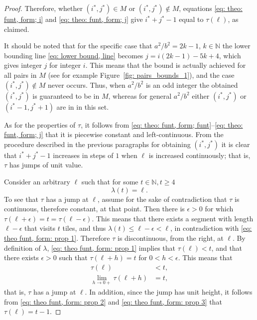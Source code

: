 \documentclass[12pt, a4paper]{article}
\newcommand{\funt}{\tau} %
\newcommand{\funl}{\lambda} %
\newcommand{\len}{\ell} %
\newcommand{\tiles}{t} %
\newcommand{\isoli}{i^\ast}
\newcommand{\jsoli}{j^\ast}
\newcommand{\mss}{M}
\newcommand{\touches}{visits}
\begin{document}
\begin{proof}
Therefore, whether $(\isoli,\jsoli) \in \mss$ or $(\isoli,\jsoli) \notin \mss$, equations \eqref{eq: theo: funt, form; i} and \eqref{eq: theo: funt, form; j} give $\isoli+\jsoli-1$ equal to $\funt(\len)$, as claimed.

It should be noted that for the specific case that $a^2/b^2 = 2k-1$, $k \in \mathbb N$ the lower bounding line \eqref{eq: lower bound, line} becomes $j = i(2k-1)-5k+4$, which gives integer $j$ for integer $i$. This means that the bound is actually achieved for all pairs in $\mss$ (see for example Figure~\ref{fig: pairs_bounds_1}), and the case $(\isoli,\jsoli) \notin \mss$ never occurs. Thus, when $a^2/b^2$ is an odd integer the obtained $(\isoli,\jsoli)$ is guaranteed to be in $\mss$, whereas for general $a^2/b^2$ either $(\isoli,\jsoli)$ or $(\isoli-1,\jsoli+1)$ are in in this set.

As for the properties of $\funt$, it follows from \eqref{eq: theo: funt, form; funt}--\eqref{eq: theo: funt, form; j} that it is piecewise constant and left-continuous. From the procedure described in the previous paragraphs for obtaining $(\isoli, \jsoli)$ it is clear that $\isoli+\jsoli-1$ increases in steps of $1$ when $\len$ is increased continuously; that is, $\funt$ has jumps of unit value.

Consider an arbitrary $\len$ such that for some $\tiles \in \mathbb N, \tiles \geq 4$
\begin{equation}
\label{eq: theo funt, form: prop 1}
\funl(\tiles)=\len.
\end{equation}
To see that $\funt$ has a jump at $\len$, assume for the sake of contradiction that $\funt$ is continuous, therefore constant, at that point. Then there is $\epsilon > 0$ for which $\funt(\len+\epsilon) = \tiles = \funt(\len-\epsilon)$. This means that there exists a segment with length $\len-\epsilon$ that \touches{} $\tiles$ tiles, and thus $\funl(\tiles) \leq \len-\epsilon < \len$, in contradiction with \eqref{eq: theo funt, form: prop 1}. Therefore $\funt$ is discontinuous, from the right, at $\len$. By definition of $\funl$, \eqref{eq: theo funt, form: prop 1} implies that $\funt(\len) < \tiles$, and that there exists $\epsilon > 0$ such that $\funt(\len+h) = \tiles$ for $0 < h < \epsilon$. This means that
\begin{align}
\label{eq: theo funt, form: prop 2}
\funt(\len) &< \tiles, \\
\label{eq: theo funt, form: prop 3}
\lim_{h \rightarrow 0+} \funt(\len+h) &= \tiles,
\end{align}
that is, $\funt$ has a jump at $\len$. In addition, since the jump has unit height, it follows from \eqref{eq: theo funt, form: prop 2} and \eqref{eq: theo funt, form: prop 3}  that $\funt(\len) = \tiles-1$.


\end{proof}
\end{document}
